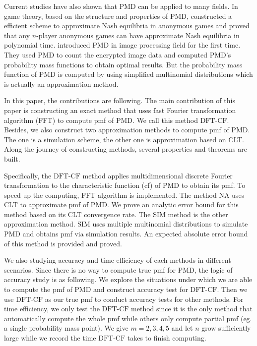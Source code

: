 \documentclass[12pt]{article}
\newcommand{\PMD}{\textrm{PMD}}
\newcommand{\SIM}{{\textrm{SIM}}}
\newcommand{\NA}{{\textrm{NA}}}
\newcommand{\dft}{{\textrm{DFT-CF}}}
\begin{document}
Current studies have also shown that $\PMD$ can be applied to many fields. In game theory, based on the structure and properties of $\PMD$,  constructed a efficient scheme to approximate Nash equilibria in anonymous games and  proved that any $n$-player anonymous games can have approximate Nash equilibria in polynomial time.  introduced $\PMD$ in image processing field for the first time. They used $\PMD$ to count the encrypted image data and computed $\PMD$'s probability mass functions to obtain optimal results. But the probability mass function of $\PMD$ is computed by using simplified multinomial distributions which is actually an approximation method.

In this paper, the contributions are following. The main contribution of this paper is constructing an exact method that uses fast Fourier transformation algorithm (FFT) to compute pmf of $\PMD$.  We call this method $\dft$. Besides, we also construct two approximation methods to compute pmf of $\PMD$. The one is a simulation scheme, the other one is approximation based on CLT. Along the journey of constructing methods, several properties and theorems are built.

Specifically, the $\dft$ method applies multidimensional discrete Fourier transformation to the characteristic function (cf) of $\PMD$ to obtain its pmf. To speed up the computing, FFT algorithm is implemented. The method $\NA$ uses CLT to approximate pmf of $\PMD$. We prove an analytic error bound for this method based on its CLT convergence rate. The $\SIM$ method is the other approximation method. $\SIM$ uses multiple multinomial distributions to simulate $\PMD$ and obtains pmf via simulation results. An expected absolute error bound of this method is provided and proved.

We also studying accuracy and time efficiency of each methods in different scenarios. Since there is no way to compute true pmf for $\PMD$, the logic of accuracy study is as following. We explore the situations under which we are able to compute the pmf of $\PMD$ and construct accuracy test for $\dft$. Then we use $\dft$ as our true pmf to conduct accuracy tests for other methods. For time efficiency, we only test the $\dft$ method since it is the only method that automatically compute the whole pmf while others only compute partial pmf (eg. a single probability mass point). We give $m=2,3,4,5$ and let $n$ grow sufficiently large while we record the time $\dft$ takes to finish computing.
\end{document}
